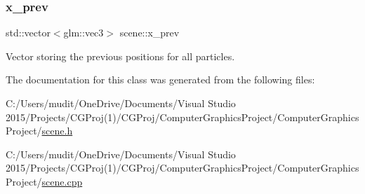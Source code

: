 \subsubsection{\texorpdfstring{x\+\_\+prev}{x\_prev}}
{\footnotesize\ttfamily std\+::vector$<$glm\+::vec3$>$ scene\+::x\+\_\+prev}



Vector storing the previous positions for all particles. 



The documentation for this class was generated from the following files\+:\begin{DoxyCompactItemize}
\item 
C\+:/\+Users/mudit/\+One\+Drive/\+Documents/\+Visual Studio 2015/\+Projects/\+C\+G\+Proj(1)/\+C\+G\+Proj/\+Computer\+Graphics\+Project/\+Computer\+Graphics\+Project/\hyperlink{scene_8h}{scene.\+h}\item 
C\+:/\+Users/mudit/\+One\+Drive/\+Documents/\+Visual Studio 2015/\+Projects/\+C\+G\+Proj(1)/\+C\+G\+Proj/\+Computer\+Graphics\+Project/\+Computer\+Graphics\+Project/\hyperlink{scene_8cpp}{scene.\+cpp}\end{DoxyCompactItemize}
